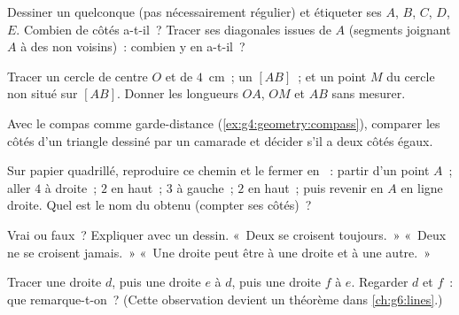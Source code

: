 \begin{exercise}[$\star$]\label{exo:g4:geometry:4}
Dessiner un  quelconque (pas nécessairement régulier) et
étiqueter ses  $A$, $B$, $C$, $D$, $E$. Combien de côtés
a-t-il~? Tracer ses diagonales issues de $A$ (segments joignant $A$
à des  non voisins)~: combien y en a-t-il~?
\end{exercise}

\begin{exercise}[$\star$]\label{exo:g4:geometry:5}
Tracer un cercle de centre $O$ et de  $4$~cm~; un 
$[AB]$~; et un point $M$ du cercle non situé sur $[AB]$. Donner les
longueurs $OA$, $OM$ et $AB$ sans mesurer.
\end{exercise}

\begin{exercise}[$\star$]\label{exo:g4:geometry:6}
Avec le compas comme garde-distance
(\cref{ex:g4:geometry:compass}), comparer les côtés d'un triangle
dessiné par un camarade et décider s'il a deux côtés égaux.
\end{exercise}

\begin{exercise}[$\star$]\label{exo:g4:geometry:7}
Sur papier quadrillé, reproduire ce chemin et le fermer en
~: partir d'un point $A$~; aller $4$ à droite~; $2$ en
haut~; $3$ à gauche~; $2$ en haut~; puis revenir en $A$ en ligne
droite. Quel est le nom du  obtenu (compter ses côtés)~?
\end{exercise}

\begin{exercise}[$\star$]\label{exo:g4:geometry:8}
Vrai ou faux~? Expliquer avec un dessin.
«~Deux  se croisent toujours.~»
«~Deux  ne se croisent jamais.~»
«~Une droite peut être  à une droite et  à
une autre.~»
\end{exercise}

\begin{exercise}[$\star\star$]\label{exo:g4:geometry:9}
Tracer une droite $d$, puis une droite $e$  à $d$,
puis une droite $f$  à $e$. Regarder $d$ et $f$~:
que remarque-t-on~? (Cette observation devient un théorème dans
\cref{ch:g6:lines}.)
\end{exercise}


